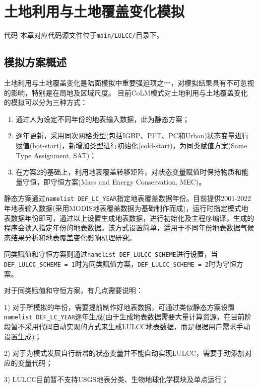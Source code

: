\chapter{土地利用与土地覆盖变化模拟}\label{土地利用与土地覆盖变化模拟}
\begin{mymdframed}{代码}
本章对应代码源文件位于\texttt{main/LULCC/}目录下。
\end{mymdframed}

\section{模拟方案概述}
土地利用与土地覆盖变化是陆面模拟中重要强迫项之一，对模拟结果具有不可忽视的影响，特别是在局地及区域尺度。
目前CoLM模式对土地利用与土地覆盖变化的模拟可以分为三种方式：
\begin{enumerate}
    \item 通过人为设定不同年份的地表输入数据，此为静态方案；
    \item 逐年更新，采用同次网格类型(包括IGBP、PFT、PC和Urban)状态变量进行赋值(hot-start)，新增加类型进行初始化(cold-start)，为同类赋值方案(Same Type Assignment, SAT)；
    \item 在方案2的基础上，利用地表覆盖转移矩阵，对状态变量赋值时保持物质和能量守恒，即守恒方案(Mass
and Energy Conservation, MEC)。
\end{enumerate}

静态方案通过\texttt{namelist DEF\_LC\_YEAR}指定地表覆盖数据年份。目前提供2001-2022年地表输入数据(采用MODIS地表覆盖数据为基础制作而成)，运行时指定模式地表数据年份即可，通过以上设置生成地表数据，进行初始化及主程序编译，生成的程序会读入指定年份的地表数据。该方式设置简单，适用于不同年份地表数据气候态结果分析和地表覆盖变化影响机理研究。

同类赋值和守恒方案则通过\texttt{namelist DEF\_LULCC\_SCHEME}进行设置，当
\texttt{DEF\_LULCC\allowbreak \_SCHEME = 1}时为同类赋值方案，\texttt{DEF\_LULCC\_SCHEME = 2}时为守恒方案。

对于同类赋值和守恒方案，有几点需要说明：

1) 对于所模拟的年份，需要提前制作好地表数据，可通过类似静态方案设置\texttt{namelist DEF\_LC\_YEAR}逐年生成(由于生成地表数据需要大量计算资源，在目前阶段暂不采用代码自动实现的方式来生成LULCC地表数据，而是根据用户需求手动设置生成)；

2) 对于为模式发展自行新增的状态变量并不能自动实现LULCC，需要手动添加对应的变量代码；

3) LULCC目前暂不支持USGS地表分类、生物地球化学模块及单点运行；

